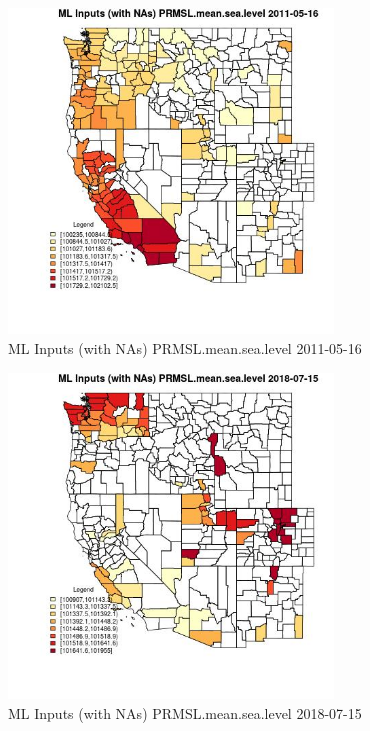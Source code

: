\begin{figure} 
\centering  
\includegraphics[width=0.77\textwidth]{Code_Outputs/Report_ML_input_PM25_Step4_part_e_de_duplicated_aves_compiled_2019-05-21wNAs_CountyPRMSLmeansealevelMean2011-05-16.jpg} 
\caption{\label{fig:Report_ML_input_PM25_Step4_part_e_de_duplicated_aves_compiled_2019-05-21wNAsCountyPRMSLmeansealevelMean2011-05-16}ML Inputs (with NAs) PRMSL.mean.sea.level 2011-05-16} 
\end{figure} 
 

\begin{figure} 
\centering  
\includegraphics[width=0.77\textwidth]{Code_Outputs/Report_ML_input_PM25_Step4_part_e_de_duplicated_aves_compiled_2019-05-21wNAs_CountyPRMSLmeansealevelMean2018-07-15.jpg} 
\caption{\label{fig:Report_ML_input_PM25_Step4_part_e_de_duplicated_aves_compiled_2019-05-21wNAsCountyPRMSLmeansealevelMean2018-07-15}ML Inputs (with NAs) PRMSL.mean.sea.level 2018-07-15} 
\end{figure} 
 

